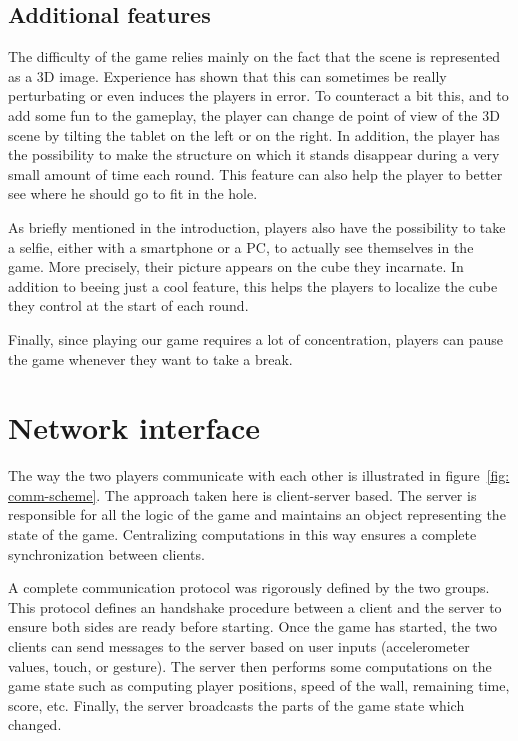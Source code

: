 \documentclass[english, DIV=13]{scrartcl}
\begin{document}
\subsection{Additional features}
The difficulty of the game relies mainly on the fact that the scene is represented as a
3D image. Experience has shown that this can sometimes be really perturbating or even
induces the players in error. To counteract a bit this, and to add some fun to the
gameplay, the player can change de point of view of the 3D scene by tilting the tablet
on the left or on the right. In addition, the player has the possibility to make the
structure on which it stands disappear during a very small amount of time each round.
This feature can also help the player to better see where he should go to fit in the hole.

As briefly mentioned in the introduction, players also have the possibility to take a
selfie, either with a smartphone or a PC, to actually see themselves in the game. More
precisely, their picture appears on the cube they incarnate. In addition to beeing just a
cool feature, this helps the players to localize the cube they control at the start of
each round.

Finally, since playing our game requires a lot of concentration, players can pause the
game whenever they want to take a break.

\section{Network interface}
\label{sec:net-interface}
The way the two players communicate with each other is illustrated in figure~\ref{fig:
comm-scheme}. The approach taken here is client-server based. The server is responsible
for all the logic of the game and maintains an object representing the state of the game.
Centralizing computations in this way ensures a complete synchronization between clients.

A complete communication protocol was rigorously defined by the two groups. This
protocol defines an handshake procedure between a client and the server to ensure both
sides are ready before starting. Once the game has started, the two clients can send
messages to the server based on user inputs (accelerometer values, touch, or gesture).
The server then performs some computations on the game state such as computing player
positions, speed of the wall, remaining time, score, etc. Finally, the server
broadcasts the parts of the game state which changed.
\end{document}

